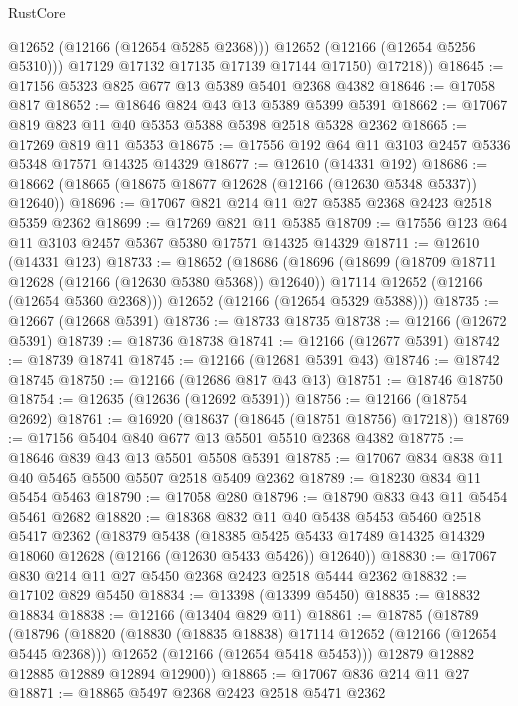 \begin{lexlean}{RustCore}
\begin{coremodule}
              @12652
              (@12166 (@12654 @5285 @2368)))
            @12652
            (@12166 (@12654 @5256 @5310)))
          @17129
          @17132
          @17135
          @17139
          @17144
          @17150)
        @17218))
@18645 := @17156 @5323 @825 @677 @13 @5389 @5401 @2368 @4382
@18646 := @17058 @817
@18652 := @18646 @824 @43 @13 @5389 @5399 @5391
@18662 := @17067 @819 @823 @11 @40 @5353 @5388 @5398 @2518 @5328 @2362
@18665 := @17269 @819 @11 @5353
@18675 := @17556 @192 @64 @11 @3103 @2457 @5336 @5348 @17571 @14325 @14329
@18677 := @12610 (@14331 @192)
@18686 := @18662 (@18665 (@18675 @18677 @12628 (@12166 (@12630 @5348 @5337)) @12640))
@18696 := @17067 @821 @214 @11 @27 @5385 @2368 @2423 @2518 @5359 @2362
@18699 := @17269 @821 @11 @5385
@18709 := @17556 @123 @64 @11 @3103 @2457 @5367 @5380 @17571 @14325 @14329
@18711 := @12610 (@14331 @123)
@18733 := @18652
    (@18686
      (@18696
        (@18699 (@18709 @18711 @12628 (@12166 (@12630 @5380 @5368)) @12640))
        @17114
        @12652
        (@12166 (@12654 @5360 @2368)))
      @12652
      (@12166 (@12654 @5329 @5388)))
@18735 := @12667 (@12668 @5391)
@18736 := @18733 @18735
@18738 := @12166 (@12672 @5391)
@18739 := @18736 @18738
@18741 := @12166 (@12677 @5391)
@18742 := @18739 @18741
@18745 := @12166 (@12681 @5391 @43)
@18746 := @18742 @18745
@18750 := @12166 (@12686 @817 @43 @13)
@18751 := @18746 @18750
@18754 := @12635 (@12636 (@12692 @5391))
@18756 := @12166 (@18754 @2692)
@18761 := @16920 (@18637 (@18645 (@18751 @18756) @17218))
@18769 := @17156 @5404 @840 @677 @13 @5501 @5510 @2368 @4382
@18775 := @18646 @839 @43 @13 @5501 @5508 @5391
@18785 := @17067 @834 @838 @11 @40 @5465 @5500 @5507 @2518 @5409 @2362
@18789 := @18230 @834 @11 @5454 @5463
@18790 := @17058 @280
@18796 := @18790 @833 @43 @11 @5454 @5461 @2682
@18820 := @18368
    @832
    @11
    @40
    @5438
    @5453
    @5460
    @2518
    @5417
    @2362
    (@18379
      @5438
      (@18385 @5425 @5433 @17489 @14325 @14329 @18060 @12628 (@12166 (@12630 @5433 @5426)) @12640))
@18830 := @17067 @830 @214 @11 @27 @5450 @2368 @2423 @2518 @5444 @2362
@18832 := @17102 @829 @5450
@18834 := @13398 (@13399 @5450)
@18835 := @18832 @18834
@18838 := @12166 (@13404 @829 @11)
@18861 := @18785
    (@18789
      (@18796
        (@18820
          (@18830 (@18835 @18838) @17114 @12652 (@12166 (@12654 @5445 @2368)))
          @12652
          (@12166 (@12654 @5418 @5453)))
        @12879
        @12882
        @12885
        @12889
        @12894
        @12900))
@18865 := @17067 @836 @214 @11 @27
@18871 := @18865 @5497 @2368 @2423 @2518 @5471 @2362

\end{coremodule}
\end{lexlean}
